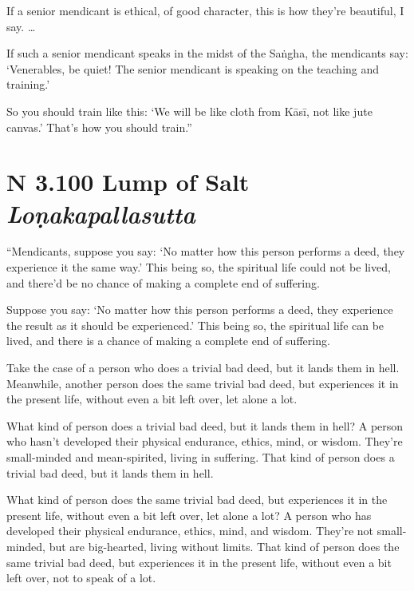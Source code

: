 \documentclass[12pt,openany]{book}%
\newcommand*{\suttatitleacronym}[1]{\smaller[2]{#1}\vspace*{.3em}}
\newcommand*{\suttatitletranslation}[1]{\linebreak{#1}}
\newcommand*{\suttatitleroot}[1]{\linebreak\smaller[2]\itshape{#1}}
\newcommand*{\tocacronym}[1]{\hspace*{-3.3em}{#1}\quad}
\newcommand*{\toctranslation}[1]{#1}
\newcommand*{\tocroot}[1]{(\textit{#1})}
\begin{document}
If a senior mendicant is ethical, of good character, this is how they’re beautiful, I say. … 

If such a senior mendicant speaks in the midst of the \textsanskrit{Saṅgha}, the mendicants say: ‘Venerables, be quiet! The senior mendicant is speaking on the teaching and training.’ 

So you should train like this: ‘We will be like cloth from \textsanskrit{Kāsī}, not like jute canvas.’ That’s how you should train.” 

%
\section*{{\suttatitleacronym AN 3.100}{\suttatitletranslation A Lump of Salt }{\suttatitleroot Loṇakapallasutta}}
\addcontentsline{toc}{section}{\tocacronym{AN 3.100} \toctranslation{A Lump of Salt } \tocroot{Loṇakapallasutta}}

“Mendicants, suppose you say: ‘No matter how this person performs a deed, they experience it the same way.’ This being so, the spiritual life could not be lived, and there’d be no chance of making a complete end of suffering. 

Suppose you say: ‘No matter how this person performs a deed, they experience the result as it should be experienced.’ This being so, the spiritual life can be lived, and there is a chance of making a complete end of suffering. 

Take the case of a person who does a trivial bad deed, but it lands them in hell. Meanwhile, another person does the same trivial bad deed, but experiences it in the present life, without even a bit left over, let alone a lot. 

What kind of person does a trivial bad deed, but it lands them in hell? A person who hasn’t developed their physical endurance, ethics, mind, or wisdom. They’re small-minded and mean-spirited, living in suffering. That kind of person does a trivial bad deed, but it lands them in hell. 

What kind of person does the same trivial bad deed, but experiences it in the present life, without even a bit left over, let alone a lot? A person who has developed their physical endurance, ethics, mind, and wisdom. They’re not small-minded, but are big-hearted, living without limits. That kind of person does the same trivial bad deed, but experiences it in the present life, without even a bit left over, not to speak of a lot. 
\end{document}
